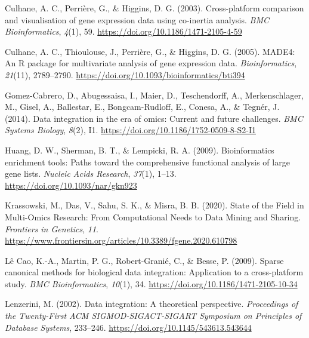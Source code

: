 \documentclass[a4paper, nobind]{templates/ociamthesis}
\newlength{\cslhangindent}
\newenvironment{CSLReferences}[2] %
 {%
  \setlength{\parindent}{0pt}
  \ifodd #1
  \let\oldpar\par
  \def\par{\hangindent=\cslhangindent\oldpar}
  \fi
  \setlength{\parskip}{1mm}
  \setlength{\baselineskip}{6mm}
 }%
 {}
\begin{document}
\begin{CSLReferences}{1}{0}
\leavevmode{}%
Culhane, A. C., Perrière, G., \& Higgins, D. G. (2003). Cross-platform comparison and visualisation of gene expression data using co-inertia analysis. \emph{BMC Bioinformatics}, \emph{4}(1), 59. \url{https://doi.org/10.1186/1471-2105-4-59}

\leavevmode{}%
Culhane, A. C., Thioulouse, J., Perrière, G., \& Higgins, D. G. (2005). {MADE4}: An {R} package for multivariate analysis of gene expression data. \emph{Bioinformatics}, \emph{21}(11), 2789--2790. \url{https://doi.org/10.1093/bioinformatics/bti394}

\leavevmode{}%
Gomez-Cabrero, D., Abugessaisa, I., Maier, D., Teschendorff, A., Merkenschlager, M., Gisel, A., Ballestar, E., Bongcam-Rudloff, E., Conesa, A., \& Tegnér, J. (2014). Data integration in the era of omics: Current and future challenges. \emph{BMC Systems Biology}, \emph{8}(2), I1. \url{https://doi.org/10.1186/1752-0509-8-S2-I1}

\leavevmode{}%
Huang, D. W., Sherman, B. T., \& Lempicki, R. A. (2009). Bioinformatics enrichment tools: Paths toward the comprehensive functional analysis of large gene lists. \emph{Nucleic Acids Research}, \emph{37}(1), 1--13. \url{https://doi.org/10.1093/nar/gkn923}

\leavevmode{}%
Krassowski, M., Das, V., Sahu, S. K., \& Misra, B. B. (2020). State of the {Field} in {Multi}-{Omics} {Research}: {From} {Computational} {Needs} to {Data} {Mining} and {Sharing}. \emph{Frontiers in Genetics}, \emph{11}. \url{https://www.frontiersin.org/articles/10.3389/fgene.2020.610798}

\leavevmode{}%
Lê Cao, K.-A., Martin, P. G., Robert-Granié, C., \& Besse, P. (2009). Sparse canonical methods for biological data integration: Application to a cross-platform study. \emph{BMC Bioinformatics}, \emph{10}(1), 34. \url{https://doi.org/10.1186/1471-2105-10-34}

\leavevmode{}%
Lenzerini, M. (2002). Data integration: A theoretical perspective. \emph{Proceedings of the Twenty-First {ACM} {SIGMOD}-{SIGACT}-{SIGART} Symposium on {Principles} of Database Systems}, 233--246. \url{https://doi.org/10.1145/543613.543644}


\end{CSLReferences}
\end{document}
